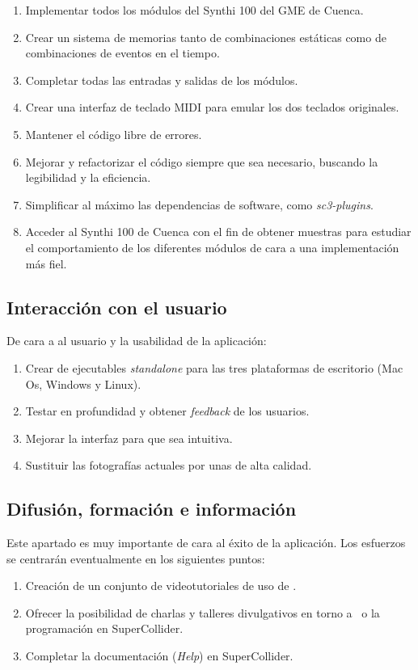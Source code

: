 \begin{enumerate}
	\item Implementar todos los módulos del Synthi 100 del GME de Cuenca.
	\item Crear un sistema de memorias tanto de combinaciones estáticas como de combinaciones de eventos en el tiempo.
	\item Completar todas las entradas y salidas de los módulos.
	\item Crear una interfaz de teclado MIDI para emular los dos teclados originales.
	\item Mantener el código libre de errores.
	\item Mejorar y refactorizar el código siempre que sea necesario, buscando la legibilidad y la eficiencia.
	\item Simplificar al máximo las dependencias de software, como \textit{sc3-plugins}.
	\item Acceder al Synthi 100 de Cuenca con el fin de obtener muestras para estudiar el comportamiento de los diferentes módulos de cara a una implementación más fiel.
\end{enumerate}


\subsection{Interacción con el usuario}
De cara a al usuario y la usabilidad de la aplicación:

\begin{enumerate}
	\item Crear de ejecutables \textit{standalone} para las tres plataformas de escritorio (Mac Os, Windows y Linux).
	\item Testar en profundidad y obtener \textit{feedback} de los usuarios.
	\item Mejorar la interfaz para que sea intuitiva.
	\item Sustituir las fotografías actuales por unas de alta calidad.	
\end{enumerate}


\subsection{Difusión, formación e información}

Este apartado es muy importante de cara al éxito de la aplicación. Los esfuerzos se centrarán eventualmente en los siguientes puntos:

\begin{enumerate}
	\item Creación de un conjunto de videotutoriales de uso de \appName.
	\item Ofrecer la posibilidad de charlas y talleres divulgativos en torno a \appName~o la programación en SuperCollider.
	\item Completar la documentación (\textit{Help}) en SuperCollider.
\end{enumerate}

